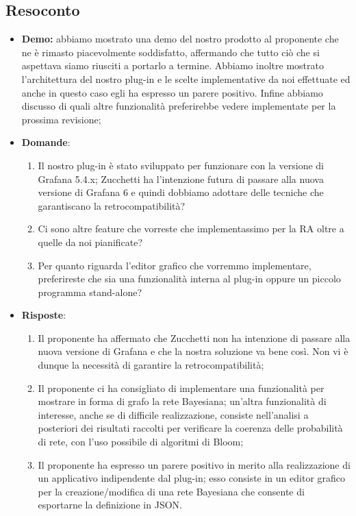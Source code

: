\subsection{Resoconto}
\begin{itemize}
	\item \textbf{Demo:} abbiamo mostrato una demo del nostro prodotto al proponente che ne è rimasto piacevolmente soddisfatto, affermando che tutto ciò che si aspettava siamo riusciti a portarlo a termine. Abbiamo inoltre mostrato l'architettura del nostro plug-in e le scelte implementative da noi effettuate ed anche in questo caso egli ha espresso un parere positivo. Infine abbiamo discusso di quali altre funzionalità preferirebbe vedere implementate per la prossima revisione;
	\item {\textbf{Domande}:
		\begin{enumerate}
			\item Il nostro plug-in è stato sviluppato per funzionare con la versione di Grafana 5.4.x; Zucchetti ha l'intenzione futura di passare alla nuova versione di Grafana 6 e quindi dobbiamo adottare delle tecniche che garantiscano la retrocompatibilità?
			\item Ci sono altre feature che vorreste che implementassimo per la RA oltre a quelle da noi pianificate?
			\item Per quanto riguarda l'editor grafico che vorremmo implementare, preferireste che sia una funzionalità interna al plug-in oppure un piccolo programma stand-alone?
		\end{enumerate}}
	\item {\textbf{Risposte}:
		\begin{enumerate}
			\item Il proponente ha affermato che Zucchetti non ha intenzione di passare alla nuova versione di Grafana e che la nostra soluzione va bene così. Non vi è dunque la necessità di garantire la retrocompatibilità;
			\item Il proponente ci ha consigliato di implementare una funzionalità per mostrare in forma di grafo la rete Bayesiana; un'altra funzionalità di interesse, anche se di difficile realizzazione, consiste nell'analisi a posteriori dei risultati raccolti per verificare la coerenza delle probabilità di rete, con l'uso possibile di algoritmi di Bloom;
			\item Il proponente ha espresso un parere positivo in merito alla realizzazione di un applicativo indipendente dal plug-in; esso consiste in un editor grafico per la creazione/modifica di una rete Bayesiana che consente di esportarne la definizione in JSON.
		\end{enumerate}}
\end{itemize}

